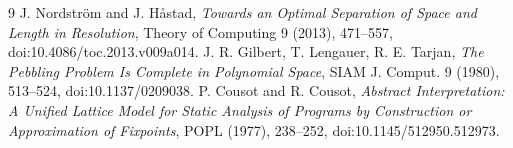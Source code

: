 \documentclass[11pt]{article}
\begin{document}
\begin{thebibliography}{9}
 J. Nordstr\"om and J. H\aa stad, \emph{Towards an Optimal Separation of Space and Length in Resolution}, Theory of Computing 9 (2013), 471--557, doi:10.4086/toc.2013.v009a014.
 J. R. Gilbert, T. Lengauer, R. E. Tarjan, \emph{The Pebbling Problem Is Complete in Polynomial Space}, SIAM J. Comput. 9 (1980), 513--524, doi:10.1137/0209038.
 P. Cousot and R. Cousot, \emph{Abstract Interpretation: A Unified Lattice Model for Static Analysis of Programs by Construction or Approximation of Fixpoints}, POPL (1977), 238--252, doi:10.1145/512950.512973.
\end{thebibliography}
\end{document}
